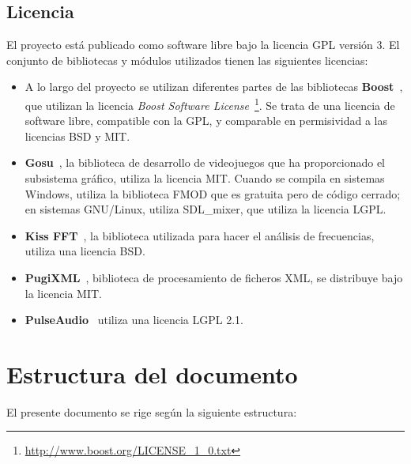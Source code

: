 \subsection{Licencia}
El proyecto está publicado como software libre bajo la licencia
\ac{GPL} versión 3. El conjunto de bibliotecas y módulos utilizados
tienen las siguientes licencias:
\begin{itemize}

\item A lo largo del proyecto se utilizan diferentes partes de las
  bibliotecas \textbf{Boost}~\cite{boost}, que utilizan la licencia
  \textit{Boost Software License}~\footnote{\url{http://www.boost.org/LICENSE_1_0.txt}}.
  Se trata de una licencia de software libre, compatible con la GPL, y
  comparable en permisividad a las licencias BSD y MIT.

\item \textbf{Gosu}~\cite{gosu}, la biblioteca de desarrollo de
  videojuegos que ha proporcionado el subsistema gráfico, utiliza la
  licencia \ac{MIT}. Cuando se compila en sistemas Windows, utiliza la
  biblioteca FMOD que es gratuita pero de código cerrado; en sistemas
  GNU/Linux, utiliza SDL\_mixer, que utiliza la licencia \ac{LGPL}.

\item \textbf{Kiss FFT}~\cite{kissfft}, la biblioteca utilizada para
  hacer el análisis de frecuencias, utiliza una licencia \ac{BSD}.

\item \textbf{PugiXML}~\cite{pugixml}, biblioteca de procesamiento de
  ficheros XML, se distribuye bajo la licencia MIT.

\item \textbf{PulseAudio}~\cite{pulseaudio} utiliza una licencia LGPL 2.1.
\end{itemize}

\section{Estructura del documento}
El presente documento se rige según la siguiente estructura:

